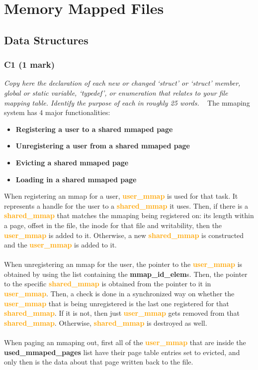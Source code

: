 \documentclass{report}
\newcommand{\question}[1]{\textit{#1} \ }
\newcommand{\bullpara}[2]{\item \textbf{#1} \ #2}
\newcommand{\struct}[1]{\textcolor{orange}{\textbf{#1}}}
\newcommand{\var}[1]{\textcolor{RoyalPurple}{\textbf{#1}}}
\newcommand{\compitem}[1]{\begin{itemize}\setlength\itemsep{-0.1em}#1\end{itemize}}
\begin{document}
	\section*{Memory Mapped Files}
		\subsection*{Data Structures}
			\subsubsection*{C1 (1 mark)}
				\question{Copy here the declaration of each new or changed `struct' or 
				`struct' member, global or static variable, `typedef', or 
				enumeration that relates to your file mapping table. Identify 
				the purpose of each in roughly 25 words.}
				The mmaping system has 4 major functionalities:
				\compitem{
					\bullpara{Registering a user to a shared mmaped page}{}
					\bullpara{Unregistering a user from a shared mmaped page}{}
					\bullpara{Evicting a shared mmaped page}{}
					\bullpara{Loading in a shared mmaped page}{}
				}
				When registering an mmap for a user, \struct{user\_mmap} is used
				for that task. It represents a handle for the user to a \struct{shared\_mmap}
				it uses. Then, if there is a \struct{shared\_mmap} that matches the mmaping being registered
				on: its length within a page, offset in the file, the inode for that file and writability,
				then the \struct{user\_mmap} is added to it. Otherwise, a new \struct{shared\_mmap} is constructed
				and the \struct{user\_mmap} is added to it.
				\\
				\\ When unregistering an mmap for the user, the pointer to the \struct{user\_mmap} is obtained
				by using the list containing the \var{mmap\_id\_elem}s. Then, the pointer to the specific \struct{shared\_mmap}
				is obtained from the pointer to it in \struct{user\_mmap}. Then, a check is done in a synchronized way on whether
				the \struct{user\_mmap} that is being unregistered is the last one registered for that \struct{shared\_mmap}. If it is not,
				then just \struct{user\_mmap} gets removed from that \struct{shared\_mmap}. Otherwise, \struct{shared\_mmap} is destroyed as well.
				\\
				\\ When paging an mmaping out, first all of the \struct{user\_mmap} that are inside the \var{used\_mmaped\_pages} list have their
				page table entries set to evicted, and only then is the data about that page written back to the file.
\end{document}
